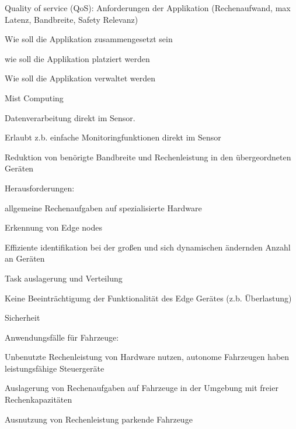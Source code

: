 \begin{notes}
\begin{notes}
\begin{notes}
\begin{notes}
                \item Quality of service (QoS): Anforderungen der Applikation (Rechenaufwand, max Latenz, Bandbreite, Safety Relevanz)
                \item Wie soll die Applikation zusammengesetzt sein
                \item wie soll die Applikation platziert werden
                \item Wie soll die Applikation verwaltet werden
                \item 
            \end{notes}
        \end{notes}
        \item Mist Computing
        \begin{notes} 
            \item Datenverarbeitung direkt im Sensor.
            \item Erlaubt z.b. einfache Monitoringfunktionen direkt im Sensor
            \item Reduktion von benörigte Bandbreite und Rechenleistung in den übergeordneten Geräten
        \end{notes}
        \item Herausforderungen:
        \begin{notes}
            \item allgemeine Rechenaufgaben auf spezialisierte Hardware
            \item Erkennung von Edge nodes
            \item Effiziente identifikation bei der großen und sich dynamischen ändernden Anzahl an Geräten
            \item Task auslagerung und Verteilung
            \item Keine Beeinträchtigumg der Funktionalität des Edge Gerätes (z.b. Überlastung)
            \item Sicherheit
        \end{notes}
        \item Anwendungsfälle für Fahrzeuge:
            \begin{notes}
                \item Unbenutzte Rechenleistung von Hardware nutzen, autonome Fahrzeugen haben leistungsfähige Steuergeräte
                \item Auslagerung von Rechenaufgaben auf Fahrzeuge in der Umgebung mit freier Rechenkapazitäten
                \item Ausnutzung von Rechenleistung parkende Fahrzeuge

\end{notes}
\end{notes}
\end{notes}
